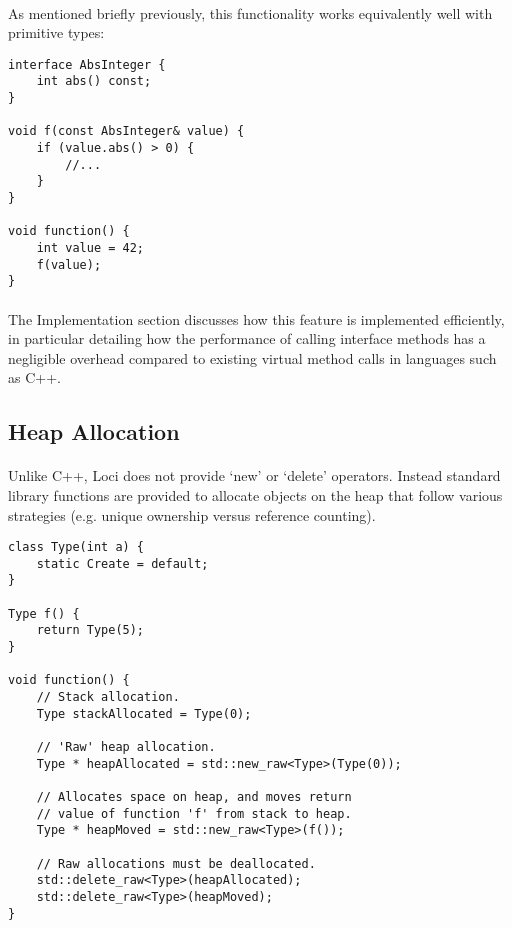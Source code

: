 \documentclass[12pt,twoside,notitlepage]{report}
\begin{document}
\paragraph{}
As mentioned briefly previously, this functionality works equivalently well with primitive types:

\begin{lstlisting}
interface AbsInteger {
	int abs() const;
}

void f(const AbsInteger& value) {
	if (value.abs() > 0) {
		//...
	}
}

void function() {
	int value = 42;
	f(value);
}
\end{lstlisting}

\paragraph{}
The Implementation section discusses how this feature is implemented efficiently, in particular detailing how the performance of calling interface methods has a negligible overhead compared to existing virtual method calls in languages such as C++.

\clearpage

\subsection{Heap Allocation}

\paragraph{}
Unlike C++, Loci does not provide `new' or `delete' operators. Instead standard library functions are provided to allocate objects on the heap that follow various strategies (e.g. unique ownership versus reference counting).


\begin{lstlisting}
class Type(int a) {
	static Create = default;
}

Type f() {
	return Type(5);
}

void function() {
	// Stack allocation.
	Type stackAllocated = Type(0);
	
	// 'Raw' heap allocation.
	Type * heapAllocated = std::new_raw<Type>(Type(0));
	
	// Allocates space on heap, and moves return
	// value of function 'f' from stack to heap.
	Type * heapMoved = std::new_raw<Type>(f());
	
	// Raw allocations must be deallocated.
	std::delete_raw<Type>(heapAllocated);
	std::delete_raw<Type>(heapMoved);
}
\end{lstlisting}
\end{document}
